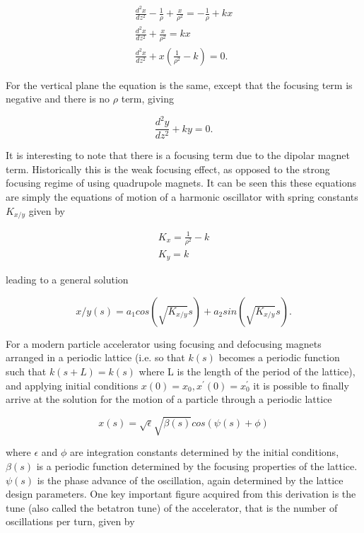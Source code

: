 \begin{align}
\frac{d^{2}x}{dz^{2}} - \frac{1}{\rho} + \frac{x}{\rho^{2}}  = - \frac{1}{\rho} + k x \\ \nonumber
\frac{d^{2}x}{dz^{2}} + \frac{x}{\rho^{2}}  = k x \\ \nonumber
\frac{d^{2}x}{dz^{2}} + x \left( \frac{1}{\rho^{2}} - k\right)  = 0.
\label{eqn:horz-eqn-motion}
\end{align}

For the vertical plane the equation is the same, except that the focusing term is negative and there is no $\rho$ term, giving

\begin{equation}
\frac{d^{2}y}{dz^{2}} +  k y  = 0.
\label{eqn:vert-eqn-motion}
\end{equation}

It is interesting to note that there is a focusing term due to the dipolar magnet term. Historically this is the weak focusing effect, as opposed to the strong focusing regime of using quadrupole magnets. It can be seen this these equations are simply the equations of motion of a harmonic oscillator with spring constants $K_{x/y}$ given by

\begin{align*}
K_{x} = \frac{1}{\rho^{2}} - k \\
K_{y} = k
\end{align*}

leading to a general solution 

\begin{equation}
x/y \left( s \right) = a_{1} cos \left( \sqrt{K_{x/y}} s \right) + a_{2} sin \left( \sqrt{K_{x/y}} s \right).
\end{equation}

For a modern particle accelerator using focusing and defocusing magnets arranged in a periodic lattice (i.e. so that $k(s)$ becomes a periodic function such that $k(s+L) = k(s)$ where L is the length of the period of the lattice), and applying initial conditions $x(0) = x_{0}, x^{'}(0) = x^{'}_{0}$ it is possible to finally arrive at the solution for the motion of a particle through a periodic lattice

\begin{equation}
x \left( s \right) = \sqrt{\epsilon} \sqrt{\beta \left( s \right) } cos \left( \psi \left( s \right) + \phi \right)
\end{equation}

where $\epsilon$ and $\phi$ are integration constants determined by the initial conditions, $\beta (s)$ is a periodic function determined by the focusing properties of the lattice. $ \psi (s)$ is the phase advance of the oscillation, again determined by the lattice design parameters. One key important figure acquired from this derivation is the tune (also called the betatron tune) of the accelerator, that is the number of oscillations per turn, given by

